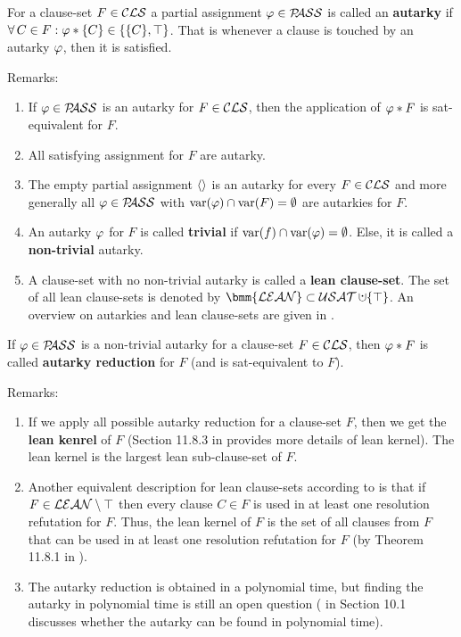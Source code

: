 \documentclass{report}
\begin{document}
\begin{defi}\label{def:autarky}
For a clause-set $F \in \mathcal{CLS}$ a partial assignment $\varphi \in \mathcal{P\hspace{-0.32em}ASS}$ is called an  \textbf{autarky} if $\forall\, C \in F : \varphi * \{ C \} \in \{ \{ C \}, \top \}$. That is whenever a clause is touched by an autarky $\varphi$, then it is satisfied.
\end{defi}
Remarks:
  \begin{enumerate}
  \item If $\varphi \in \mathcal{P\hspace{-0.32em}ASS}$ is an autarky for $F \in \mathcal{CLS}$, then the application of $\varphi *F$ is sat-equivalent for $F$. 
  \item All satisfying assignment for $F$ are autarky.
  \item The empty partial assignment $\langle  \rangle$ is an autarky for every $F \in \mathcal{CLS}$ and more generally all $\varphi \in \mathcal{P\hspace{-0.32em}ASS}$ with $\operatorname{var}(\varphi) \cap \operatorname{var}(F) = \emptyset$ are autarkies for $F$. 
  \item An autarky $\varphi$ for $F$ is called \textbf{trivial} if $\operatorname{var}(f) \cap \operatorname{var}(\varphi) = \emptyset$. Else, it is called a \textbf{non-trivial} autarky.
  \item A clause-set with no non-trivial autarky is called a \textbf{lean clause-set}. The set of all lean clause-sets is denoted by $\bmm{\Lean} \subset \Usat \addcup \set{\top}$. An overview on autarkies and lean clause-sets are given in \cite{Ku00f, Kullmann2007HandbuchMU}. 
  \end{enumerate}
  
\begin{defi}\label{def:autarky-redc}
If $\varphi \in \mathcal{P\hspace{-0.32em}ASS}$ is a non-trivial autarky for a clause-set $F \in \mathcal{CLS}$, then $\varphi *F$ is called \textbf{autarky reduction} for $F$ (and is sat-equivalent to $F$).
\end{defi} 
Remarks:
  \begin{enumerate}
  \item If we apply all possible autarky reduction for a clause-set $F$, then we get the \textbf{lean kenrel} of $F$ (Section 11.8.3 in \cite{Kullmann2007HandbuchMU} provides more details of lean kernel). The lean kernel is the largest lean sub-clause-set of $F$.
  \item Another equivalent description for lean clause-sets according to \cite{Ku00f} is that if $F \in \mathcal{LEAN} \setminus \top$ then every clause $C \in F$ is used in at least one resolution refutation for $F$. Thus, the lean kernel of $F$ is the set of all clauses from $F$ that can be used in at least one resolution refutation for $F$ (by Theorem 11.8.1 in \cite{Kullmann2007HandbuchMU}).
  \item The autarky reduction is obtained in a polynomial time, but finding the autarky in polynomial time is still an open question (\cite{KullmannZhao2010Extremal} in Section 10.1 discusses whether the autarky can be found in polynomial time).
  \end{enumerate}
\end{document}
